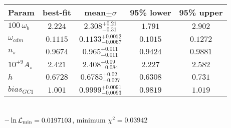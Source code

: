 \begin{tabular}{|l|c|c|c|c|} 
 \hline 
Param & best-fit & mean$\pm\sigma$ & 95\% lower & 95\% upper \\ \hline 
$100~\omega_{b }$ &$2.224$ & $2.308_{-0.31}^{+0.21}$ & $1.791$ & $2.902$ \\ 
$\omega_{cdm }$ &$0.1115$ & $0.1133_{-0.0067}^{+0.0052}$ & $0.1015$ & $0.1272$ \\ 
$n_{s }$ &$0.9674$ & $0.965_{-0.011}^{+0.011}$ & $0.9424$ & $0.9881$ \\ 
$10^{+9}A_{s }$ &$2.421$ & $2.408_{-0.084}^{+0.09}$ & $2.227$ & $2.582$ \\ 
$h$ &$0.6728$ & $0.6785_{-0.027}^{+0.02}$ & $0.6308$ & $0.731$ \\ 
$bias_{GC 1 }$ &$1.001$ & $0.9999_{-0.0093}^{+0.0091}$ & $0.9819$ & $1.019$ \\ 
\hline 
 \end{tabular} \\ 
$-\ln{\cal L}_\mathrm{min} =0.0197103$, minimum $\chi^2=0.03942$ \\ 
